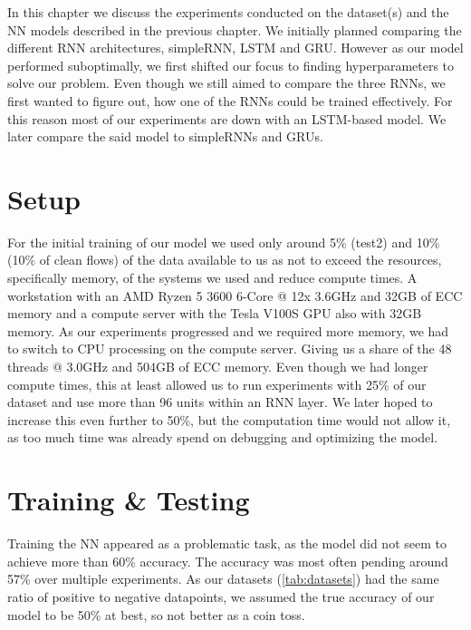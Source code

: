 \documentclass[
	ngerman,
	ruledheaders=section,%
	class=report,%
	thesis={type=bachelor},%
	accentcolor=9c,%
	custommargins=true,%
	marginpar=false,%
	parskip=half-,%
	fontsize=11pt,%
]{tudapub}
\begin{document}
In this chapter we discuss the experiments conducted on the dataset(s) and the NN models described in the previous chapter.
We initially planned comparing the different RNN architectures, simpleRNN, LSTM and GRU.
However as our model performed suboptimally, we first shifted our focus to finding hyperparameters to solve our problem.
Even though we still aimed to compare the three RNNs, we first wanted to figure out, how one of the RNNs could be trained effectively.
For this reason most of our experiments are down with an LSTM-based model.
We later compare the said model to simpleRNNs and GRUs.

\section{Setup}
\label{sec:exSetup}


For the initial training of our model we used only around 5\% (test2) and 10\% (10\% of clean flows) of the data available to us as not to exceed the resources, specifically memory, of the systems we used and reduce compute times.
A workstation with an AMD Ryzen 5 3600 6-Core @ 12x 3.6GHz and 32GB of ECC memory and a compute server with the Tesla V100S GPU also with 32GB memory.
As our experiments progressed and we required more memory, we had to switch to CPU processing on the compute server.
Giving us a share of the 48 threads @ 3.0GHz and 504GB of ECC memory.
Even though we had longer compute times, this at least allowed us to run experiments with 25\% of our dataset and use more than 96 units within an RNN layer.
We later hoped to increase this even further to 50\%, but the computation time would not allow it, as too much time was already spend on debugging and optimizing the model.

\section{Training \& Testing}
\label{sec:exTrainTest}

Training the NN appeared as a problematic task, as the model did not seem to achieve more than 60\% accuracy.
The accuracy was most often pending around 57\% over multiple experiments.
As our datasets (\ref{tab:datasets}) had the same ratio of positive to negative datapoints, we assumed the true accuracy of our model to be 50\% at best, so not better as a coin toss.
\end{document}
